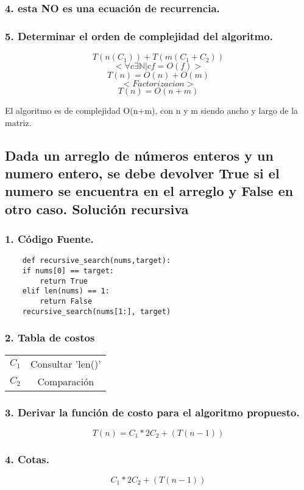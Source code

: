 \documentclass[12pt]{exam}
\begin{document}
\subsubsection*{4. esta NO es una ecuación de recurrencia.}
\subsubsection*{5. Determinar el orden de complejidad del algoritmo.}

$$ T(n(C_1)) + T(m(C_1+C_2)) $$
$$< \forall c \exists \mathbb{N} | cf = O(f) >$$
$$ T(n) = O(n) + O(m) $$
$$ < Factorizacion > $$ 
$$ T(n) = O(n+m) $$


El algoritmo es de complejidad O(n+m), con n y m siendo ancho y largo de la
matriz.

\subsection*{Dada un arreglo de números enteros y un numero entero, se debe devolver
True si el numero se encuentra en el arreglo y False en otro caso. Solución recursiva}
\subsubsection*{1. Código Fuente.}
\begin{verbatim}
    def recursive_search(nums,target):
    if nums[0] == target:
        return True
    elif len(nums) == 1:
        return False
    recursive_search(nums[1:], target)
\end{verbatim}

\subsubsection*{2. Tabla de costos}
\begin{center}
    \begin{tabular}{||c c||}
        $C_1$ & Consultar 'len()' \\
        $C_2$ & Comparación\\
    \end{tabular}
\end{center}


\subsubsection*{3. Derivar la función de costo para el algoritmo propuesto.}
$$ T(n) = C_1*2C_2+(T(n-1)) $$

\subsubsection*{4. Cotas.}
$$ C_1*2C_2+(T(n-1)) $$
\end{document}
